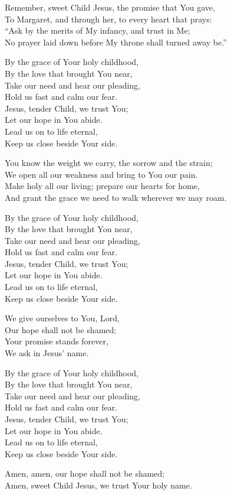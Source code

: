 \begin{lyrics}
Remember, sweet Child Jesus, the promise that You gave,\\
To Margaret, and through her, to every heart that prays:\\
“Ask by the merits of My infancy, and trust in Me;\\
No prayer laid down before My throne shall turned away be.”

By the grace of Your holy childhood,\\
By the love that brought You near,\\
Take our need and hear our pleading,\\
Hold us fast and calm our fear.\\
Jesus, tender Child, we trust You;\\
Let our hope in You abide.\\
Lead us on to life eternal,\\
Keep us close beside Your side.

You know the weight we carry, the sorrow and the strain;\\
We open all our weakness and bring to You our pain.\\
Make holy all our living; prepare our hearts for home,\\
And grant the grace we need to walk wherever we may roam.

By the grace of Your holy childhood,\\
By the love that brought You near,\\
Take our need and hear our pleading,\\
Hold us fast and calm our fear.\\
Jesus, tender Child, we trust You;\\
Let our hope in You abide.\\
Lead us on to life eternal,\\
Keep us close beside Your side.

We give ourselves to You, Lord,\\
Our hope shall not be shamed;\\
Your promise stands forever,\\
We ask in Jesus’ name.

By the grace of Your holy childhood,\\
By the love that brought You near,\\
Take our need and hear our pleading,\\
Hold us fast and calm our fear.\\
Jesus, tender Child, we trust You;\\
Let our hope in You abide.\\
Lead us on to life eternal,\\
Keep us close beside Your side.

Amen, amen, our hope shall not be shamed;\\
Amen, sweet Child Jesus, we trust Your holy name.
\end{lyrics}

